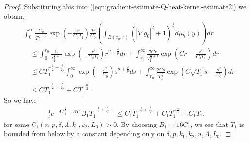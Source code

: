 \documentclass[12pt]{amsart}
\theoremstyle{plain}
\theoremstyle{plain}
\theoremstyle{definition}
\theoremstyle{remark}
\numberwithin{equation}{subsection}
\newcommand{\hdel}{\tilde{\nabla}}
\begin{document}
\begin{proof}
    Substituting this into (\ref{eqn:gradient-estimate-Q-heat-kernel-estimate2}) we obtain,
    \begin{align*}
        &\int_0^{\infty} \frac{C_0}{T_1^{\frac{n}{2}+1}}\exp\left(-\frac{r^2}{C_0 T_1}\right)\frac{2r}{C_0}\left(\int_{B(x_0, r)}\left(|\hdel g_0|^2 + 1\right)^{\frac{1}{2}}d\mu_h(y)\right)dr \nonumber \\
        &\quad \leq \int_0^{r_0} \frac{C}{T_1^{\frac{n}{2}+1}}\exp\left(-\frac{r^2}{C_0 T_1}\right)r^{n+\frac{\delta}{p}}dr + \int_{r_0}^{\infty} \frac{2Cr}{T_1^{\frac{n}{2}+1}}\exp\left(Cr-\frac{r^2}{C_0 T_1}\right)  dr \nonumber \\
        &\quad \leq CT_1^{-\frac{1}{2}+\frac{\delta}{2p}}\int_0^\infty\exp\left(-\frac{s^2}{C_0}\right)s^{n+\frac{\delta}{p}}ds + \int_{r_0}^\infty \frac{2Cs}{T_1^{\frac{n}{2}}}\exp\left(C\sqrt{T_1}s- \frac{s^2}{C_0} \right) dr\\
        &\quad\leq CT_1^{-\frac{1}{2}+\frac{\delta}{2p}} +  CT_1^{-\frac{n}{2}}.
    \end{align*}
  So we have
    \begin{align}\label{eqn:gradient-estimate-Q-heat-kernel-estimate4}
        \frac14 e^{-AT_1^{\frac{\delta}{p}}-AT_1}B_1T_1^{-\frac{1}{2}+\frac{\delta}{2p}} &\leq C_1 T_1^{-\frac{1}{2}+\frac{\delta}{2p}} +  C_1T_1^{-\frac{n}{2}}+ C_1 T_1.
    \end{align}
    for some $C_1(n,p,\delta,\Lambda,k_1,k_2,L_0)>0$.
 By choosing $B_1=16C_1$, we see that $T_1$ is bounded from below by a constant depending only on $\delta,p,k_1,k_2,n,\Lambda,L_0$.
\end{proof}
\end{document}
